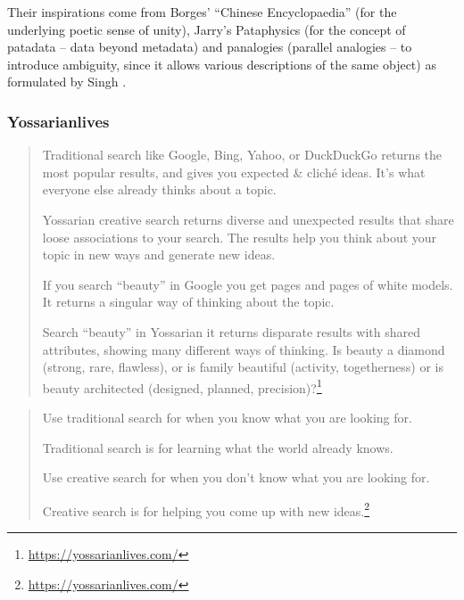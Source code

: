 Their inspirations come from Borges' ``Chinese Encyclopaedia'' \autocite{Borges2000} (for the underlying poetic sense of unity), Jarry's Pataphysics \autocite{Jarry1996} (for the concept of patadata – data beyond metadata) and  panalogies (parallel analogies – to introduce ambiguity, since it allows various descriptions of the same object) as formulated by Singh \autocite{Singh2005}.


\subsubsection*{Yossarianlives}

\begin{quote}
  Traditional search like Google, Bing, Yahoo, or DuckDuckGo returns the most popular results, and gives you expected \& cliché ideas. It's what everyone else already thinks about a topic.

  Yossarian creative search returns diverse and unexpected results that share loose associations to your search. The results help you think about your topic in new ways and generate new ideas.

  If you search ``beauty'' in Google you get pages and pages of white models. It returns a singular way of thinking about the topic.

  Search ``beauty'' in Yossarian it returns disparate results with shared attributes, showing many different ways of thinking. Is beauty a diamond (strong, rare, flawless), or is family beautiful (activity, togetherness) or is beauty architected (designed, planned, precision)?\footnote{\url{https://yossarianlives.com/}}
\end{quote}

\begin{quote}
  Use traditional search for when you know what you are looking for.

  Traditional search is for learning what the world already knows.

  Use creative search for when you don't know what you are looking for.

  Creative search is for helping you come up with new ideas.\footnote{\url{https://yossarianlives.com/}}
\end{quote}

